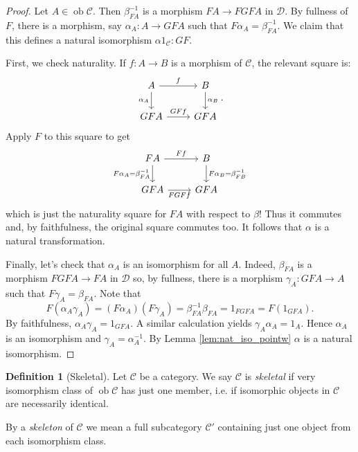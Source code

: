 \documentclass{report}
\DeclareMathOperator{\ob}{ob}
\theoremstyle{definition}
\theoremstyle{plain}
\theoremstyle{definition}
\newtheorem{defn}[thm]{Definition}
\begin{document}
\begin{proof}
		Let $A\in\ob\mathcal{C}$. Then $\beta_{FA}^{-1}$ is a morphism $FA\to FGFA$ in $\mathcal{D}$. By fullness of $F$, there is a morphism, say $\alpha_A\colon A \to GFA$ such that $F\alpha_A = \beta_{FA}^{-1}$. We claim that this defines a natural isomorphism $\alpha 1_{\mathcal{C}}\colon GF$. 
		
		First, we check naturality. If $f\colon A \to B$ is a morphism of $\mathcal{C}$, the relevant square is:
		\[\begin{tikzcd}
			A & {B } \\
			GFA & GFA
			\arrow["f", from=1-1, to=1-2]
			\arrow["GFf", from=2-1, to=2-2]
			\arrow["{\alpha_A}"', from=1-1, to=2-1]
			\arrow["{\alpha_B}", from=1-2, to=2-2]
		\end{tikzcd}.\]
	Apply $F$ to this square to get
	\[\begin{tikzcd}
		FA & {B } \\
		GFA & GFA
		\arrow["Ff", from=1-1, to=1-2]
		\arrow["FGFf"', from=2-1, to=2-2]
		\arrow["{F\alpha_A= \beta_{FA}^{-1}}"', from=1-1, to=2-1]
		\arrow["{F\alpha_B = \beta_{FB}^{-1}}", from=1-2, to=2-2]
	\end{tikzcd}\]
	 which is just the naturality square for $FA$ with respect to $\beta$! Thus it commutes and, by faithfulness, the original square commutes too. It follows that $\alpha$ is a natural transformation.
	 
	 Finally, let's check that $\alpha_A$ is an isomorphism for all $A$. Indeed, $\beta_{FA}$ is a morphism $FGFA \to FA$ in $\mathcal{D}$ so, by fullness, there is a morphism $\gamma_A \colon GFA \to A$ such that $F\gamma_A = \beta_{FA}$. Note that
	 \[
	 	F(\alpha_A\gamma_A) = (F\alpha_A)(F\gamma_A) = \beta_{FA}^{-1}\beta_{FA} = 1_{FGFA} = F(1_{GFA}).
	 \]
	 By faithfulness, $\alpha_A\gamma_A = 1_{GFA}$. A similar calculation yields $\gamma_A\alpha_A = 1_{A}$. Hence $\alpha_A$ is an isomorphism and $\gamma_A = \alpha_A^{-1}$. By Lemma \ref{lem:nat_iso_pointw} $\alpha$ is a natural isomorphism. 
	 \end{proof}
	 \begin{defn}[Skeletal]
	 	Let $\mathcal{C}$ be a category. We say $\mathcal{C}$ is \emph{skeletal} if very isomorphism class of $\ob\mathcal{C}$ has just one member, i.e. if isomorphic objects in $\mathcal{C}$ are necessarily identical.
	 	
	 	By a \emph{skeleton} of $\mathcal{C}$ we mean a full subcategory $\mathcal{C}'$ containing just one object from each isomorphism class.
	 \end{defn}
\end{document}
